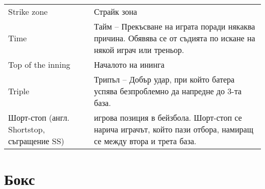 \begin{longtable}{|m{6em}|m{25em}|}
Strike zone &Страйк зона\\ 
Time &Тайм – Прекъсване на играта поради някаква причина. Обявява се от съдията по искане на някой играч или треньор.\\ 
Top of the inning &Началото на ининга\\ 
Triple &Трипъл – Добър удар, при който батера успява безпроблемно да напредне до 3-та база.\\ 
Шорт-стоп (англ. Shortstop, съгращение SS) & игрова позиция в бейзбола. Шорт-стоп се нарича играчът, който пази отбора, намиращ се между втора и трета база.\\
\hline
\end{longtable}

\section{Бокс}

